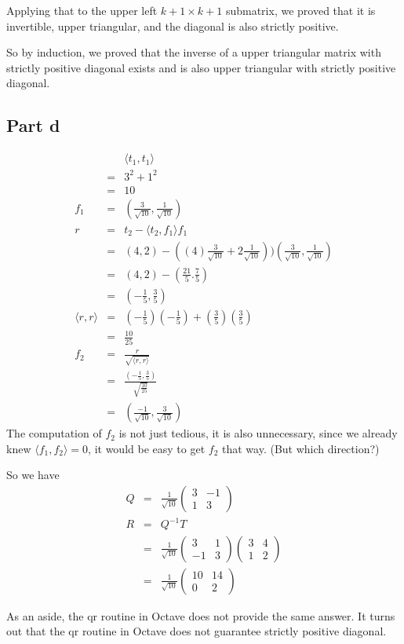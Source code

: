 Applying that to the upper left $ k + 1 \times k + 1 $ submatrix, we proved that it is invertible, upper triangular, and the diagonal is also strictly positive.

So by induction, we proved that the inverse of a upper triangular matrix with strictly positive diagonal exists and is also upper triangular with strictly positive diagonal.
\subsection*{Part d}
\begin{eqnarray*}
  & & \langle t_1, t_1 \rangle \\
  &=& 3^2 + 1^2 \\
  &=& 10 \\
  f_1 &=& (\frac{3}{\sqrt{10}},\frac{1}{\sqrt{10}}) \\
  r &=& t_2 - \langle t_2, f_1 \rangle f_1 \\
    &=& (4, 2) - ((4)\frac{3}{\sqrt{10}} + 2\frac{1}{\sqrt{10}}))(\frac{3}{\sqrt{10}},\frac{1}{\sqrt{10}}) \\
    &=& (4, 2) - (\frac{21}{5}. \frac{7}{5}) \\
    &=& (-\frac{1}{5}, \frac{3}{5}) \\
  \langle r, r \rangle &=& (-\frac{1}{5})(-\frac{1}{5}) + (\frac{3}{5})(\frac{3}{5}) \\
    &=& \frac{10}{25} \\
  f_2 &=& \frac{r}{\sqrt{\langle r, r \rangle}} \\
      &=& \frac{(-\frac{1}{5}, \frac{3}{5})}{\sqrt{\frac{10}{25}}} \\
      &=& (\frac{-1}{\sqrt{10}},\frac{3}{\sqrt{10}})
\end{eqnarray*}
The computation of $ f_2 $ is not just tedious, it is also unnecessary, since we already knew $ \langle f_1, f_2 \rangle = 0 $, it would be easy to get $ f_2 $ that way. (But which direction?)

So we have
\begin{eqnarray*}
  Q &=& \frac{1}{\sqrt{10}}\left(\begin{array}{cc}
     3 & -1 \\
     1 & 3 
  \end{array}\right) \\
  R &=& Q^{-1}T \\
  &=& \frac{1}{\sqrt{10}}\left(\begin{array}{cc}
     3 & 1 \\
     -1 & 3 
  \end{array}\right)\left(\begin{array}{cc}
     3 & 4 \\
     1 & 2 
  \end{array}\right) \\
  &=& \frac{1}{\sqrt{10}}\left(\begin{array}{cc}
     10 & 14 \\
     0 & 2
  \end{array}\right)
\end{eqnarray*}

As an aside, the qr routine in Octave does not provide the same answer. It turns out that the qr routine in Octave does not guarantee strictly positive diagonal.